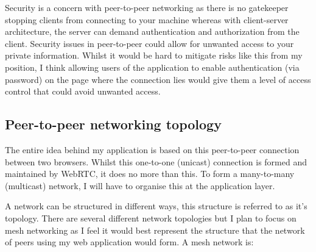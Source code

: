 \documentclass[]{report}
\begin{document}
			Security is a concern with peer-to-peer networking as there is no gatekeeper stopping clients from connecting to your machine whereas with client-server architecture, the server can demand authentication and authorization from the client. Security issues in peer-to-peer could allow for unwanted access to your private information. Whilst it would be hard to mitigate risks like this from my position, I think allowing users of the application to enable authentication (via password) on the page where the connection lies would give them a level of access control that could avoid unwanted access.
			
		
		\subsection*{Peer-to-peer networking topology}
			The entire idea behind my application is based on this peer-to-peer connection between two browsers. Whilst this one-to-one (unicast) connection is formed and maintained by WebRTC, it does no more than this. To form a many-to-many (multicast) network, I will have to organise this at the application layer.
		
			A network can be structured in different ways, this structure is referred to as it's topology. There are several different network topologies but I plan to focus on mesh networking as I feel it would best represent the structure that the network of peers using my web application would form. A mesh network is: 
		
\end{document}

